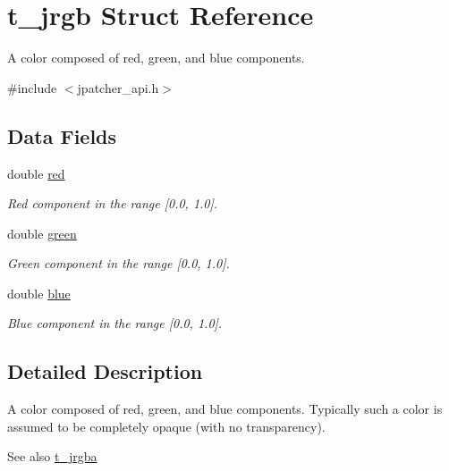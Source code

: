 \hypertarget{structt__jrgb}{
\section{t\_\-jrgb Struct Reference}
\label{structt__jrgb}
}


A color composed of red, green, and blue components.  


{\ttfamily \#include $<$jpatcher\_\-api.h$>$}\subsection*{Data Fields}
\begin{DoxyCompactItemize}
\item 
\hypertarget{structt__jrgb_ac5be259bd02917a292fb8690e4db6a08}{
double \hyperlink{structt__jrgb_ac5be259bd02917a292fb8690e4db6a08}{red}}
\label{structt__jrgb_ac5be259bd02917a292fb8690e4db6a08}

\begin{DoxyCompactList}\small\item\em Red component in the range \mbox{[}0.0, 1.0\mbox{]}. \item\end{DoxyCompactList}\item 
\hypertarget{structt__jrgb_ac91479ca6fa91e1e15c9ec38f37122fe}{
double \hyperlink{structt__jrgb_ac91479ca6fa91e1e15c9ec38f37122fe}{green}}
\label{structt__jrgb_ac91479ca6fa91e1e15c9ec38f37122fe}

\begin{DoxyCompactList}\small\item\em Green component in the range \mbox{[}0.0, 1.0\mbox{]}. \item\end{DoxyCompactList}\item 
\hypertarget{structt__jrgb_a67f8352f8ce662eab024c3fa62b0138f}{
double \hyperlink{structt__jrgb_a67f8352f8ce662eab024c3fa62b0138f}{blue}}
\label{structt__jrgb_a67f8352f8ce662eab024c3fa62b0138f}

\begin{DoxyCompactList}\small\item\em Blue component in the range \mbox{[}0.0, 1.0\mbox{]}. \item\end{DoxyCompactList}\end{DoxyCompactItemize}


\subsection{Detailed Description}
A color composed of red, green, and blue components. Typically such a color is assumed to be completely opaque (with no transparency).

\begin{DoxySeeAlso}{See also}
\hyperlink{structt__jrgba}{t\_\-jrgba} 
\end{DoxySeeAlso}
